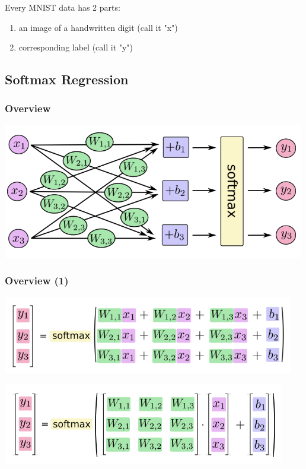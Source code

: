 \documentclass[11pt]{article}
\begin{document}
Every MNIST data has 2 parts:
\begin{enumerate}
\item an image of a handwritten digit (call it "x")
\item corresponding label (call it "y")
\end{enumerate}
\subsection*{Softmax Regression}
\label{sec:org0ad7ebb}
\subsubsection*{Overview}
\label{sec:orgcacafd9}
\begin{center}
\includegraphics[width=.9\linewidth]{images/softmax_1.png}
\end{center}
\subsubsection*{Overview (1)}
\label{sec:org1f731ae}
\begin{center}
\begin{center}
\includegraphics[width=.9\linewidth]{images/softmax_2.png}
\end{center}
\end{center}

\begin{center}
\begin{center}
\includegraphics[width=.9\linewidth]{images/softmax_3.png}
\end{center}
\end{center}
\end{document}
